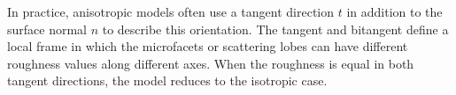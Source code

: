 In practice, anisotropic models often use a tangent direction $t$ in addition to the surface normal
$n$ to describe this orientation. The tangent and bitangent define a local frame in which the
microfacets or scattering lobes can have different roughness values along different axes. When the
roughness is equal in both tangent directions, the model reduces to the isotropic case.




